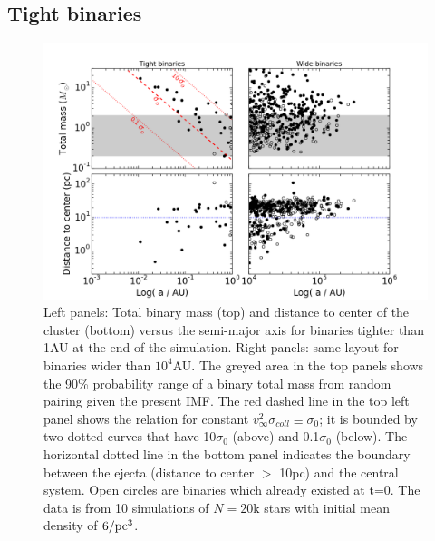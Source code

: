 \subsection{Tight binaries}

\begin{figure}
\begin{center}
\includegraphics[width=\textwidth]{Figures/6_extreme_binaries_LD}
\caption{ Left panels: Total binary mass (top) and distance to center of the cluster (bottom) versus the semi-major axis for binaries tighter than 1AU at the end of the simulation. Right panels: same layout for binaries wider than $10^4$AU. The greyed area in the top panels shows the 90\% probability range of a binary total mass from random pairing given the present IMF. The  red dashed line in the top left panel shows the relation for  constant $v^2_\infty \sigma_{coll} \equiv \sigma_0$; it is bounded by two dotted curves that have 10$\sigma_0$ (above) and 0.1$\sigma_0$ (below). The horizontal dotted line in the bottom panel indicates the boundary between the ejecta (distance to center $>$ 10pc) and the central system. Open circles are binaries which already existed at t=0. The data is from 10 simulations of $N = 20$k stars with initial mean density of $6 /{\textrm{pc}}^3$.}
\label{Fig:6_extreme_LD}
\end{center}
\end{figure}

